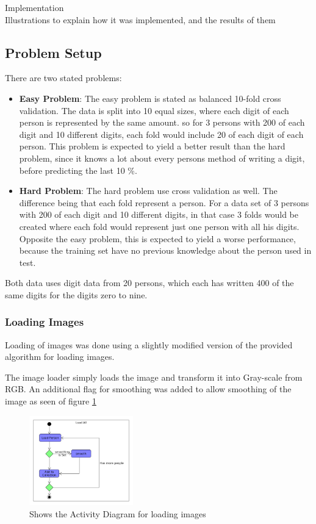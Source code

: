 \documentclass[report]{subfiles}
\begin{document}
Implementation\\
Illustrations to explain how it was implemented, and the results of them
\subsection{Problem Setup}
There are two stated problems:
\begin{itemize}
\item \textbf{Easy Problem}: The easy problem is stated as balanced 10-fold cross validation. The data is split into 10 equal sizes, where each digit of each person is represented by the same amount. so for 3 persons with 200 of each digit and 10 different digits, each fold would include 20 of each digit of each person.
  This problem is expected to yield a better result than the hard problem, since it knows a lot about every persons method of writing a digit, before predicting the last 10 \%.  
\item \textbf{Hard Problem}: The hard problem use cross validation as well. The difference being that each fold represent a person. For a data set of 3 persons with 200 of each digit and 10 different digits, in that case 3 folds would be created where each fold would represent just one person with all his digits.
  Opposite the easy problem, this is expected to yield a worse performance, because the training set have no previous knowledge about the person used in test. 
\end{itemize}

Both data uses digit data from 20 persons, which each has written 400 of the same digits for the digits zero to nine.

\subsubsection{Loading Images}
Loading of images was done using a slightly modified version of the provided algorithm for loading images.

The image loader simply loads the image and transform it into Gray-scale from RGB.
An additional flag for smoothing was added to allow smoothing of the image as seen of figure \ref{fig:loading}

\begin{figure}[H]
  \centering
  \includegraphics[width=0.4\textwidth]{UML/load}
  \caption{Shows the Activity Diagram for loading images}
  \label{fig:loading}
\end{figure}
\end{document}
